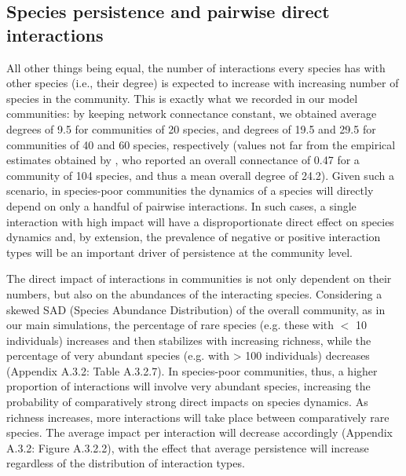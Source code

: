 \subsection*{Species persistence and pairwise direct interactions}

All other things being equal, the number of interactions every species has with other species (i.e., their degree) is expected to increase with increasing number of species in the community. This is exactly what we recorded in our model communities: by keeping network connectance constant, we obtained average degrees of 9.5 for communities of 20 species, and degrees of 19.5 and 29.5 for communities of 40 and 60 species, respectively (values not far from the empirical estimates obtained by \cite{Kefi2015}, who reported an overall connectance of 0.47 for a community of 104 species, and thus a mean overall degree of 24.2). Given such a scenario, in species-poor communities the dynamics of a species will directly depend on only a handful of pairwise interactions. In such cases, a single interaction with high impact will have a disproportionate direct effect on species dynamics and, by extension, the prevalence of negative or positive interaction types will be an important driver of persistence at the community level.

The direct impact of interactions in communities is not only dependent on their numbers, but also on the abundances of the interacting species. Considering a skewed SAD (Species Abundance Distribution) of the overall community, as in our main simulations, the percentage of rare species (e.g. these with $<$ 10 individuals) increases and then stabilizes with increasing richness, while the percentage of very abundant species (e.g. with > 100 individuals) decreases (Appendix A.3.2: Table A.3.2.7). In species-poor communities, thus, a higher proportion of interactions will involve very abundant species, increasing the probability of comparatively strong direct impacts on species dynamics. As richness increases, more interactions will take place between comparatively rare species. The average impact per interaction will decrease accordingly (Appendix A.3.2: Figure A.3.2.2), with the effect that average persistence will increase regardless of the distribution of interaction types.

